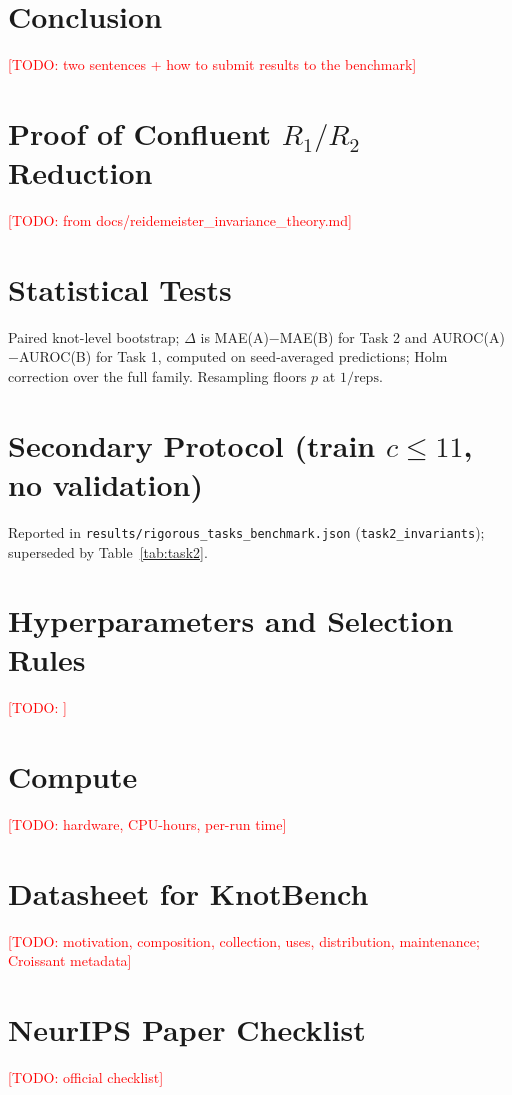 \documentclass{article}
\newcommand{\todo}[1]{\textcolor{red}{[TODO: #1]}}
\begin{document}
\section{Conclusion}\label{sec:conclusion}
\todo{two sentences + how to submit results to the benchmark}




\appendix
\section{Proof of Confluent $R_1/R_2$ Reduction}\label{app:proof}
\todo{from docs/reidemeister\_invariance\_theory.md}
\section{Statistical Tests}\label{app:stats}
Paired knot-level bootstrap; $\Delta$ is MAE(A)$-$MAE(B) for Task 2 and
AUROC(A)$-$AUROC(B) for Task 1, computed on seed-averaged predictions; Holm correction over the full family. Resampling floors $p$ at $1/\text{reps}$.
{\footnotesize}
\section{Secondary Protocol (train $c{\le}11$, no validation)}
Reported in \texttt{results/rigorous\_tasks\_benchmark.json}
(\texttt{task2\_invariants}); superseded by Table~\ref{tab:task2}.
\section{Hyperparameters and Selection Rules}\todo{}
\section{Compute}\todo{hardware, CPU-hours, per-run time}
\section{Datasheet for KnotBench}\todo{motivation, composition, collection,
uses, distribution, maintenance; Croissant metadata}

\clearpage
\section*{NeurIPS Paper Checklist}
\todo{official checklist}
\end{document}
